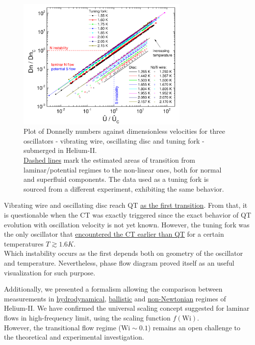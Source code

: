 \begin{figure}[h]
	\centering
	\includegraphics[width=0.75\textwidth]{graphics/results/flow_phase_diagram}
	\caption{Plot of Donnelly numbers against dimensionless velocities for three oscillators - vibrating wire, oscillating disc and tuning fork - submerged in Helium-II.\\
	\underline{Dashed lines} mark the estimated areas of transition from laminar/potential regimes to the non-linear ones, both for normal and superfluid components. The data used as a tuning fork is sourced from a different experiment, exhibiting the same behavior.}
	\label{flow_phase_diagram}
\end{figure}

Vibrating wire and oscillating disc reach QT \underline{as the first transition}. From that, it is questionable when the CT was exactly triggered since the exact behavior of QT evolution with oscillation velocity is not yet known. However, the tuning fork was the only oscillator that \underline{encountered the CT earlier than QT} for a certain temperatures $T \gtrsim 1.6\unit{K}$.\\
Which instability occurs as the first depends both on geometry of the oscillator and temperature. Nevertheless, phase flow diagram proved itself as an useful visualization for such purpose.

Additionally, we presented a formalism allowing the comparison between measurements in \underline{hydrodynamical}, \underline{ballistic} and \underline{non-Newtonian} regimes of Helium-II. We have confirmed the universal scaling concept suggested for laminar flows in high-frequency limit, using the scaling function $f(\text{Wi})$.\\
However, the transitional flow regime ($\text{Wi} \sim 0.1$) remains an open challenge to the theoretical and experimental investigation.


